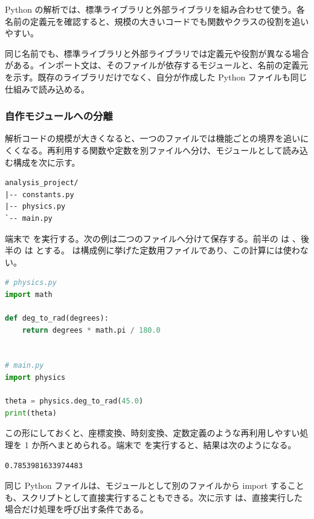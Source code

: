 Python の解析では、標準ライブラリと外部ライブラリを組み合わせて使う。各名前の定義元を確認すると、規模の大きいコードでも関数やクラスの役割を追いやすい。

同じ名前でも、標準ライブラリと外部ライブラリでは定義元や役割が異なる場合がある。インポート文は、そのファイルが依存するモジュールと、名前の定義元を示す。既存のライブラリだけでなく、自分が作成した Python ファイルも同じ仕組みで読み込める。

\subsubsection{自作モジュールへの分離}

解析コードの規模が大きくなると、一つのファイルでは機能ごとの境界を追いにくくなる。再利用する関数や定数を別ファイルへ分け、モジュールとして読み込む構成を次に示す。

\begin{lstlisting}[numbers=none, xleftmargin=2\zw]
analysis_project/
|-- constants.py
|-- physics.py
`-- main.py
\end{lstlisting}

端末で  を実行する。次の例は二つのファイルへ分けて保存する。前半の  は 、後半の  は  とする。 は構成例に挙げた定数用ファイルであり、この計算には使わない。

\begin{lstlisting}[language=Python]
# physics.py
import math

def deg_to_rad(degrees):
    return degrees * math.pi / 180.0


# main.py
import physics

theta = physics.deg_to_rad(45.0)
print(theta)
\end{lstlisting}

この形にしておくと、座標変換、時刻変換、定数定義のような再利用しやすい処理を 1 か所へまとめられる。端末で  を実行すると、結果は次のようになる。

\begin{lstlisting}[numbers=none, xleftmargin=2\zw]
0.7853981633974483
\end{lstlisting}

同じ Python ファイルは、モジュールとして別のファイルから import することも、スクリプトとして直接実行することもできる。次に示す  は、直接実行した場合だけ処理を呼び出す条件である。

